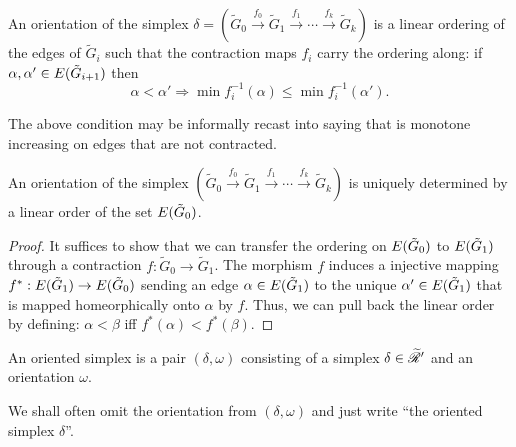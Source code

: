 \begin{definition}
  An orientation of the simplex $\delta = ({\tilde G}_0 \overset{f_0}\to {\tilde
    G}_1 \overset{f_1}\to \cdots \overset{f_k}\to {\tilde G}_k)$ is a linear
  ordering of the edges of ${\tilde G}_i$ such that the contraction maps
  $f_i$ carry the ordering along: if $\alpha, \alpha' \in E({\tilde G}_{i+1})$ then
  \begin{equation*}
    \alpha < \alpha' \Rightarrow \min f_i^{-1}(\alpha) \leq \min f_i^{-1}(\alpha').
  \end{equation*}
\end{definition}
The above condition may be informally recast into saying that is
monotone increasing on edges that are not contracted.
\begin{lemma}
  An orientation of the simplex $({\tilde G}_0 \overset{f_0}\to {\tilde
    G}_1 \overset{f_1}\to \cdots \overset{f_k}\to {\tilde G}_k)$ is uniquely
  determined by a linear order of the set $E({\tilde G}_0)$.
\end{lemma}
\begin{proof}
  It suffices to show that we can transfer the ordering on
  $E({\tilde G}_0)$ to $E({\tilde G}_1)$ through a
  contraction $f: {\tilde G}_0 \to {\tilde G}_1$.
  The morphism $f$ induces a injective mapping $f^*: E({\tilde
      G}_1) \to E({\tilde G}_0)$ sending an edge $\alpha \in
  E({\tilde G}_1)$ to the unique $\alpha' \in E({\tilde G}_1)$ that
  is mapped homeorphically onto $\alpha$ by $f$.  Thus, we can pull back
  the linear order by defining: $\alpha < \beta$ iff $f^*(\alpha) < f^*(\beta)$. 
\end{proof}

\begin{definition}
  An oriented simplex is a pair $(\delta, \omega)$ consisting of a simplex $\delta \in
  \mathscr{\widetilde R}'$ and an orientation $\omega$.
\end{definition}
We shall often omit the orientation from $(\delta, \omega)$ and just write ``the
oriented simplex $\delta$''.

